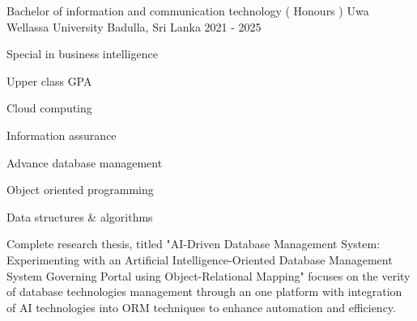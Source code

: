 

\begin{cventries}

  \cventry
    {Bachelor of information and communication technology ( Honours )} %
    {Uwa Wellassa University} %
    {Badulla, Sri Lanka} %
    {2021 - 2025} %
    {
      \begin{cvitems} %
        \item {Special in business intelligence }
        \item {Upper class GPA}
        \item {Cloud computing}
        \item {Information assurance }
        \item {Advance database management}
        \item {Object oriented programming}
        \item {Data structures  &  algorithms}
        \item {Complete research thesis, titled "AI-Driven Database Management System: Experimenting with an Artificial Intelligence-Oriented Database Management System Governing Portal using Object-Relational Mapping" focuses on the verity of database technologies management through an one platform with integration of AI technologies into ORM techniques to enhance automation and efficiency.}
      \end{cvitems}
    }

\end{cventries}
